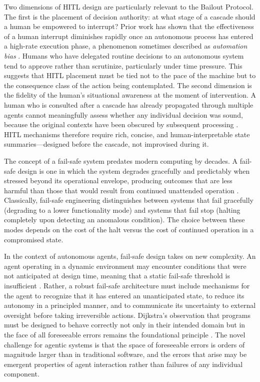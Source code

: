 Two dimensions of HITL design are particularly relevant to the
Bailout Protocol.  The first is the placement of decision authority:
at what stage of a cascade should a human be empowered to interrupt?
Prior work has shown that the effectiveness of a human interrupt
diminishes rapidly once an autonomous process has entered a
high-rate execution phase, a phenomenon sometimes described as
\emph{automation bias} \cite{bansal2019}.  Humans who have delegated
routine decisions to an autonomous system tend to approve rather than
scrutinize, particularly under time pressure.  This suggests that HITL
placement must be tied not to the pace of the machine but to the
consequence class of the action being contemplated.  The second
dimension is the fidelity of the human's situational awareness at the
moment of intervention.  A human who is consulted after a cascade has
already propagated through multiple agents cannot meaningfully assess
whether any individual decision was sound, because the original
contexts have been obscured by subsequent processing
\cite{dijkstra1982}.  HITL mechanisms therefore require rich,
concise, and human-interpretable state summaries—designed before the
cascade, not improvised during it.

The concept of a fail-safe system predates modern computing by
decades.  A fail-safe design is one in which the system degrades
gracefully and predictably when stressed beyond its operational
envelope, producing outcomes that are less harmful than those that
would result from continued unattended operation \cite{tristr81}.
Classically, fail-safe engineering distinguishes between systems that
fail gracefully (degrading to a lower functionality mode) and systems
that fail stop (halting completely upon detecting an anomalous
condition).  The choice between these modes depends on the cost of
the halt versus the cost of continued operation in a compromised state.

In the context of autonomous agents, fail-safe design takes on new
complexity.  An agent operating in a dynamic environment may encounter
conditions that were not anticipated at design time, meaning that a
static fail-safe threshold is insufficient \cite{bansal2019}.  Rather,
a robust fail-safe architecture must include mechanisms for the agent
to recognize that it has entered an unanticipated state, to reduce its
autonomy in a principled manner, and to communicate its uncertainty
to external oversight before taking irreversible actions.  Dijkstra's
observation that programs must be designed to behave correctly not only
in their intended domain but in the face of all foreseeable errors
remains the foundational principle \cite{dijkstra1982}.  The novel
challenge for agentic systems is that the space of foreseeable errors
is orders of magnitude larger than in traditional software, and the
errors that arise may be emergent properties of agent interaction
rather than failures of any individual component.

